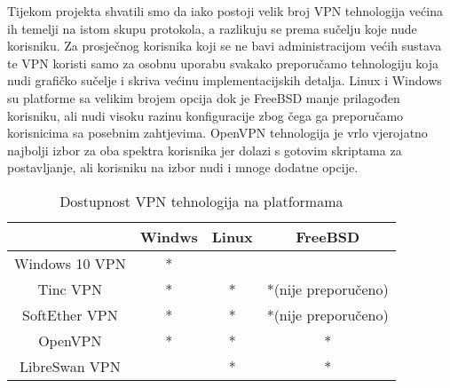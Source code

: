 Tijekom projekta shvatili smo da iako postoji velik broj VPN tehnologija
većina ih temelji na istom skupu protokola, a razlikuju se prema sučelju koje
nude korisniku. Za prosječnog korisnika koji se ne bavi administracijom većih
sustava te VPN koristi samo za osobnu uporabu svakako preporučamo tehnologiju
koja nudi grafičko sučelje i skriva većinu implementacijskih detalja. Linux i
Windows su platforme sa velikim brojem opcija dok je FreeBSD manje
prilagođen korisniku, ali nudi visoku razinu konfiguracije zbog čega ga
preporučamo korisnicima sa posebnim zahtjevima. OpenVPN tehnologija je vrlo
vjerojatno najbolji izbor za oba spektra korisnika jer dolazi s gotovim
skriptama za postavljanje, ali korisniku na izbor nudi i mnoge dodatne opcije. 
\begin{table}[H]
\centering
\begin{tabular}{c | c | c | c }
	 & \textbf{Windws} & \textbf{Linux} & \textbf{FreeBSD} \\
	 \hline

	Windows 10 VPN & * & &  \\
	\hline
        Tinc VPN & * & * & *(nije preporučeno)  \\
	\hline
	SoftEther VPN & * & * & *(nije preporučeno) \\
	\hline
	OpenVPN & * & * & *  \\
	\hline
	LibreSwan VPN & & *  & * \\
\end{tabular}
       \caption{Dostupnost VPN tehnologija na platformama}
\end{table}
